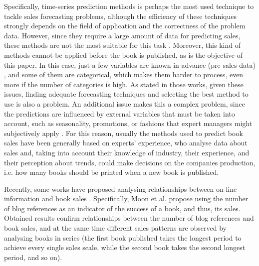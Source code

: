 \documentclass[a4paper,10pt,twocolumn,preprint,3p]{elsarticle}
\begin{document}
Specifically, time-series prediction methods
\cite{Chu2003,Brown1959,Winters1960,Box1969,Papalexopoulos1990,KayacanUK10}  
is perhaps the most used technique to tackle sales forecasting
problems, although the efficiency of these techniques strongly depends on the 
field of application and the correctness of the problem data. However, since 
they require a large amount of data for predicting sales, these methods are not 
the most suitable for this task \cite{ChingChin2010}. 
Moreover, this kind of methods cannot be applied before the book is published, 
as is the objective of this paper. 
In this case, just a few variables are known in advance (pre-sales data)
\cite{ChingChin2010,FaderHardie2005,Madsen2008}, and some of 
them are categorical, which makes them harder to process, even more if 
the number of categories is high. As stated in those works, given these issues, 
finding adequate forecasting techniques and selecting the best method to use 
is also a problem.
An additional issue makes this a complex problem, since the predictions are 
influenced by external variables that must be taken into account, such as
seasonality, promotions, or fashions that expert managers might
subjectively apply \cite{Lapide1999,ChernWSF15}.
For this reason, usually the methods used to predict book sales have
been generally based on experts' experience, who analyse data about sales and, 
taking into account their knowledge of industry, their experience, 
and their perception about trends, could make decisions on the companies 
production, i.e. how many books should be printed when a new book is published. 

Recently, some works have proposed analysing relationships between on-line 
information and book sales \cite{Moon2010ICSSSM,Moon2010ICEC}. 
Specifically, Moon et al. propose using the number of blog references as an 
indicator of the success of a book, and thus, its sales. 
Obtained results confirm relationships between the number of blog references 
and book sales, and at the same time different sales patterns are observed 
by analysing books in series (the first book published takes the longest period 
to achieve every single sales scale, while the second book takes the second 
longest period, and so on).
\end{document}
